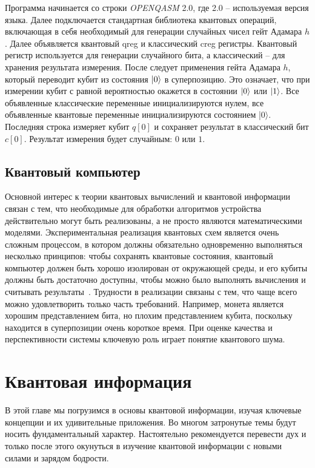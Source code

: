 \documentclass[12pt,a4paper]{article}
\begin{document}
	Программа начинается со строки \textit{OPENQASM} 2.0, где 2.0 -- используемая версия языка.
	Далее подключается стандартная библиотека квантовых операций, включающая в себя необходимый для генерации случайных чисел гейт Адамара $h$. Далее объявляется квантовый qreg и классический creg регистры. Квантовый регистр используется для генерации случайного бита, а классический -- для хранения результата измерения. После следует применения гейта Адамара $h$, который переводит кубит из состояния $\ket{0}$ в суперпозицию. Это означает, что при измерении кубит с равной вероятностью окажется в состоянии  $\ket{0}$ или  $\ket{1}$.
	Все объявленные классические переменные инициализируются нулем, все объявленные квантовые переменные инициализируются состоянием |0$\rangle$. Последняя строка измеряет кубит $q[0]$ и сохраняет результат в классический бит $c[0]$. Результат измерения будет случайным: $0 $ или $1$.	
	
	\subsection{Квантовый компьютер}
	
	Основной интерес к теории квантовых вычислений и квантовой информации связан с тем, что необходимые для обработки алгоритмов устройства действительно могут быть реализованы, а не просто являются математическими моделями. Экспериментальная реализация квантовых схем является очень сложным процессом, в котором должны обязательно одновременно выполняться несколько принципов: чтобы сохранять квантовые состояния, квантовый компьютер должен быть хорошо изолирован от окружающей среды, и его кубиты должны быть достаточно доступны, чтобы можно было выполнять вычисления и считывать результаты~\cite{1}. Трудности в реализации связаны с тем, что чаще всего можно удовлетворить только часть требований. Например, монета является хорошим представлением бита, но плохим представлением кубита, поскольку находится в суперпозиции очень короткое время. При оценке качества  и перспективности системы ключевую роль играет понятие квантового шума.
	
	\section{Квантовая информация}
	В этой главе мы погрузимся в основы квантовой информации, изучая ключевые концепции и их удивительные приложения. Во многом затронутые темы будут носить фундаментальный характер. Настоятельно рекомендуется перевести дух и только после этого окунуться в изучение квантовой информации с новыми силами и зарядом бодрости.
\end{document}
